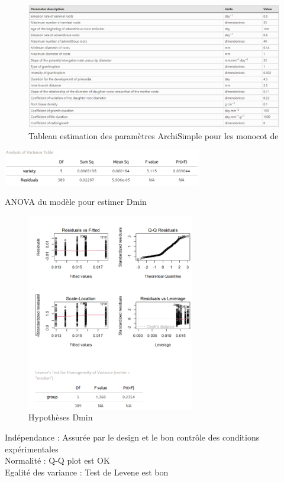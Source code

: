 \newpage

\label{an:Poaceae}
\begin{figure}[ht]
\centering
\includegraphics[width=1\textwidth]{Image/parametre Poaceae.png}
\caption{Tableau estimation des paramètres ArchiSimple pour les monocot de \cite{gerard_modelling_2017}}
\end{figure}

\newpage

\label{an:Dmin}
\begin{table}[ht]
\centering
\includegraphics[width=0.65\textwidth]{Image/anova Dmin.png}
\caption{ANOVA du modèle pour estimer Dmin}
\end{table}
\begin{figure}[ht]
\centering
\includegraphics[width=0.65\textwidth]{Image/hypothese Dmin.png}
\caption{Hypothèses Dmin}
\end{figure}
\noindent Indépendance : Assurée par le design et le bon contrôle des conditions expérimentales \\
Normalité : Q-Q plot est OK \\
Egalité des variance : Test de Levene est bon


